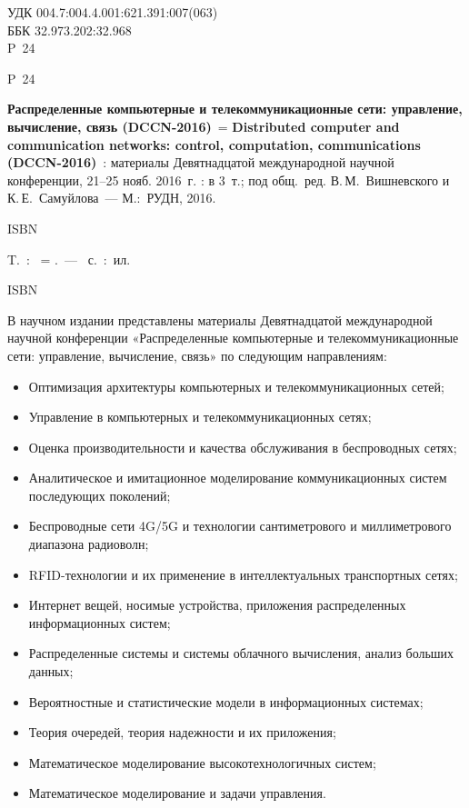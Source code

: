 \thispagestyle{empty}
{%
%
\small%

\begin{flushleft}
УДК 004.7:004.4.001:621.391:007(063)\\
ББК 32.973.202:32.968\\
\quad\quad P~24
\end{flushleft}

\bigskip

\noindent
\begin{minipage}[t]{0.1\linewidth}
P~24
\end{minipage}
\hfill
\begin{minipage}[t]{0.85\linewidth}
\textbf{Распределенные компьютерные и телекоммуникационные
сети: управление, вычисление, связь (DCCN-2016)}~=
\textbf{Distributed computer and communication networks: control, computation, communications
(DCCN-2016)}~:
материалы Девятнадцатой международной научной
конференции, 21--25 нояб. 2016~г. : в 3~т.;
под общ.~ред. В.\,М.~Вишневского и К.\,Е.~Самуйлова~--- М.:~РУДН, 2016.

\noindent
ISBN \isbn

\noindent
T.~\volumeNum : \volume~= \volumeEn.~--- 
\numpages{}~с.~:~ил.


\noindent
ISBN \isbnVol
\end{minipage}

\noindent
\grant

\bigskip

В научном издании представлены материалы
Девятнадцатой международной научной
конференции «Распределенные компьютерные и телекоммуникационные сети:
управление, вычисление, связь» по следующим направлениям:
\begin{itemize}
\item Оптимизация архитектуры компьютерных и телекоммуникационных сетей;
\item Управление в компьютерных и телекоммуникационных сетях;
\item Оценка производительности и качества обслуживания в беспроводных сетях;
\item Аналитическое и имитационное моделирование коммуникационных систем последующих поколений;
\item Беспроводные сети 4G/5G и технологии сантиметрового и миллиметрового диапазона радиоволн;
\item RFID-технологии и их применение в интеллектуальных транспортных сетях;
\item Интернет вещей, носимые устройства, приложения распределенных информационных систем;
\item Распределенные системы и системы облачного вычисления, анализ больших данных;
\item Вероятностные и статистические модели в информационных системах;
\item Теория очередей, теория надежности и их приложения;
\item Математическое моделирование высокотехнологичных систем;
\item Математическое моделирование и задачи управления.
\end{itemize}

}

